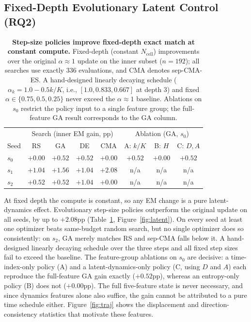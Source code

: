 ﻿\documentclass[11pt]{article}
\begin{document}
\subsection{Fixed-Depth Evolutionary Latent Control (RQ2)}
\label{sec:exp-latent}

\begin{table}[t]
\centering
\footnotesize
\setlength{\tabcolsep}{1.5pt}
\begin{tabular}{lcccc|ccc}
\toprule
& \multicolumn{4}{c|}{Search (inner EM gain, pp)} & \multicolumn{3}{c}{Ablation (GA, $s_0$)} \\
Seed & RS & GA & DE & CMA & A: $k/K$ & B: $H$ & C: $D,A$ \\
\midrule
$s_0$ & $+0.00$ & $+0.52$ & $+0.52$ & $+0.00$ & $+0.52$ & $+0.00$ & $+0.52$ \\
$s_1$ & $+1.04$ & $+1.56$ & $+1.04$ & $+2.08$ & n/a & n/a & n/a \\
$s_2$ & $+0.52$ & $+0.52$ & $+1.04$ & $+0.00$ & n/a & n/a & n/a \\
\bottomrule
\end{tabular}
\caption{\textbf{Step-size policies improve fixed-depth exact match at constant compute.} Fixed-depth (constant $N_{\mathrm{cell}}$) improvements over the original $\alpha{\approx}1$ update on the inner subset ($n{=}192$); all searches use exactly 336 evaluations, and CMA denotes sep-CMA-ES. A hand-designed linearly decaying schedule ($\alpha_k = 1.0-0.5k/K$, i.e., $[1.0, 0.833, 0.667]$ at depth 3) and fixed $\alpha \in \{0.75, 0.5, 0.25\}$ never exceed the $\alpha{\approx}1$ baseline. Ablations on $s_0$ restrict the policy input to a single feature group; the full-feature GA result corresponds to the GA column.}
\label{tab:latent}
\end{table}

At fixed depth the compute is constant, so any EM change is a pure latent-dynamics effect. Evolutionary step-size policies outperform the original update on all seeds, by up to $+2.08$pp (Table~\ref{tab:latent}, Figure~\ref{fig:latent}). On every seed at least one optimizer beats same-budget random search, but no single optimizer does so consistently: on $s_2$, GA merely matches RS and sep-CMA falls below it. A hand-designed linearly decaying schedule over the three steps and all fixed step sizes fail to exceed the baseline. The feature-group ablations on $s_0$ are decisive: a time-index-only policy (A) and a latent-dynamics-only policy (C, using $D$ and $A$) each reproduce the full-feature GA gain exactly ($+0.52$pp), whereas an entropy-only policy (B) does not ($+0.00$pp). The full five-feature state is never necessary, and since dynamics features alone also suffice, the gain cannot be attributed to a pure time schedule either. Figure~\ref{fig:traj} shows the displacement and direction-consistency statistics that motivate these features.
\end{document}
